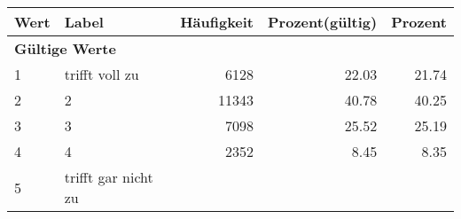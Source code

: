      \begin{longtable}{lXrrr}
     \toprule
     \textbf{Wert} & \textbf{Label} & \textbf{Häufigkeit} & \textbf{Prozent(gültig)} & \textbf{Prozent} \\
     \endhead
     \midrule
     \multicolumn{5}{l}{\textbf{Gültige Werte}}\\

     1 &
     \multicolumn{1}{X}{ trifft voll zu   } &


       \num{6128} &
       \num[round-mode=places,round-precision=2]{22,03} &
         \num[round-mode=places,round-precision=2]{21,74} \\

     2 &
     \multicolumn{1}{X}{ 2   } &


       \num{11343} &
       \num[round-mode=places,round-precision=2]{40,78} &
         \num[round-mode=places,round-precision=2]{40,25} \\

     3 &
     \multicolumn{1}{X}{ 3   } &


       \num{7098} &
       \num[round-mode=places,round-precision=2]{25,52} &
         \num[round-mode=places,round-precision=2]{25,19} \\

     4 &
     \multicolumn{1}{X}{ 4   } &


       \num{2352} &
       \num[round-mode=places,round-precision=2]{8,45} &
         \num[round-mode=places,round-precision=2]{8,35} \\

     5 &
     \multicolumn{1}{X}{ trifft gar nicht zu   } &



\end{longtable}
